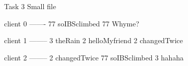 Task 3 Small file

client 0
-------
77 soIBSclimbed
77 Whyme?

client 1
--------
3 theRain
2 helloMyfriend
2 changedTwice

client 2
--------
2 changedTwice
77 soIBSclimbed
3 hahaha